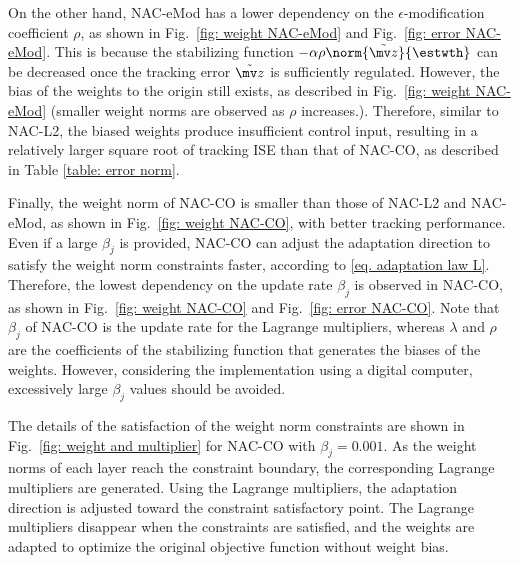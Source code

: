 \documentclass[letterpaper, 10 pt, conference]{ieeeconf}  %
\begin{document}
On the other hand, NAC-eMod has a lower dependency on the $\epsilon$-modification coefficient $\rho$, as shown in Fig.~\ref{fig: weight NAC-eMod} and Fig.~\ref{fig: error NAC-eMod}.
This is because the stabilizing function $-\alpha\rho\norm{\tilde {\mv z}}{\estwth}$ can be decreased once the tracking error $\tilde {\mv z}$ is sufficiently regulated.
However, the bias of the weights to the origin still exists, as described in Fig.~\ref{fig: weight NAC-eMod} (\ie smaller weight norms are observed as $\rho$ increases.).
Therefore, similar to NAC-L2, the biased weights produce insufficient control input, resulting in a relatively larger square root of tracking ISE than that of NAC-CO, as described in Table \ref{table: error norm}.

Finally, the weight norm of NAC-CO is smaller than those of NAC-L2 and NAC-eMod, as shown in Fig.~\ref{fig: weight NAC-CO}, with better tracking performance.
Even if a large $\beta_j$ is provided, NAC-CO can adjust the adaptation direction to satisfy the weight norm constraints faster, according to \eqref{eq. adaptation law L}.
Therefore, the lowest dependency on the update rate $\beta_j$ is observed in NAC-CO, as shown in Fig.~\ref{fig: weight NAC-CO} and Fig.~\ref{fig: error NAC-CO}.
Note that $\beta_j$ of NAC-CO is the update rate for the Lagrange multipliers, whereas $\lambda$ and $\rho$ are the coefficients of the stabilizing function that generates the biases of the weights.
However, considering the implementation using a digital computer, excessively large $\beta_j$ values should be avoided.

The details of the satisfaction of the weight norm constraints are shown in Fig.~\ref{fig: weight and multiplier} for NAC-CO with $\beta_j=0.001$.
As the weight norms of each layer reach the constraint boundary, the corresponding Lagrange multipliers are generated.
Using the Lagrange multipliers, the adaptation direction is adjusted toward the constraint satisfactory point.
The Lagrange multipliers disappear when the constraints are satisfied, and the weights are adapted to optimize the original objective function without weight bias.
\end{document}
